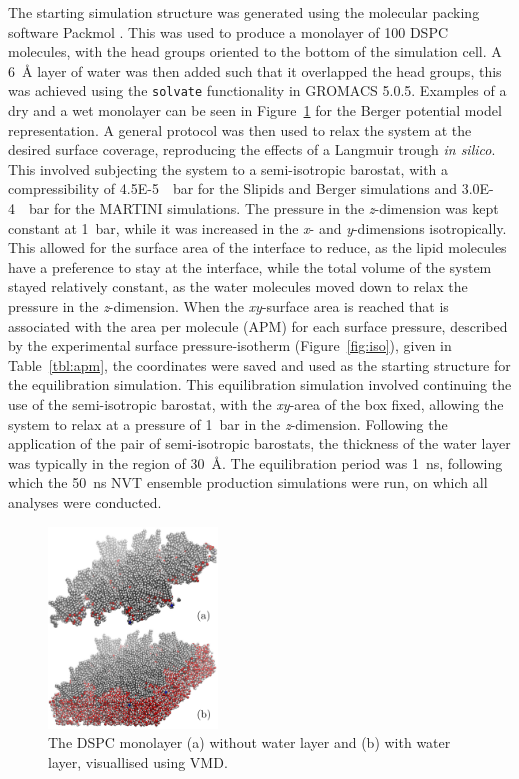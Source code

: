 \documentclass[amsmath,amssymb,twocolumn,superscriptaddress]{revtex4-1}
\begin{document}
The starting simulation structure was generated using the molecular packing software Packmol \cite{martinez_packmol_2009}.
This was used to produce a monolayer of 100 DSPC molecules, with the head groups oriented to the bottom of the simulation cell.
A \SI{6}{\angstrom} layer of water was then added such that it overlapped the head groups, this was achieved using the \texttt{solvate} functionality in GROMACS 5.0.5.
Examples of a dry and a wet monolayer can be seen in Figure~\ref{fig:drywet} for the Berger potential model representation.
A general protocol was then used to relax the system at the desired surface coverage, reproducing the effects of a Langmuir trough \emph{in silico}.
This involved subjecting the system to a semi-isotropic barostat, with a compressibility of \SI{4.5E-5}{\per\bar} for the Slipids and Berger simulations and \SI{3.0E-4}{\per\bar} for the MARTINI simulations.
The pressure in the \emph{z}-dimension was kept constant at \SI{1}{\bar}, while it was increased in the \emph{x}- and \emph{y}-dimensions isotropically.
This allowed for the surface area of the interface to reduce, as the lipid molecules have a preference to stay at the interface, while the total volume of the system stayed relatively constant, as the water molecules moved down to relax the pressure in the \emph{z}-dimension.
When the \emph{xy}-surface area is reached that is associated with the area per molecule (APM) for each surface pressure, described by the experimental surface pressure-isotherm (Figure~\ref{fig:iso}), given in Table~\ref{tbl:apm}, the coordinates were saved and used as the starting structure for the equilibration simulation.
This equilibration simulation involved continuing the use of the semi-isotropic barostat, with the \emph{xy}-area of the box fixed, allowing the system to relax at a pressure of \SI{1}{\bar} in the \emph{z}-dimension.
Following the application of the pair of semi-isotropic barostats, the thickness of the water layer was typically in the region of \SI{30}{\angstrom}.
The equilibration period was \SI{1}{\nano\second}, following which the \SI{50}{\nano\second} NVT ensemble production simulations were run, on which all analyses were conducted.
%
\begin{figure}[h]
\centering
  \includegraphics[width=0.4\textwidth]{dspcdrywet}
  \caption{The DSPC monolayer (a) without water layer and (b) with water
  layer, visuallised using VMD\cite{humphrey_vmd_1996}.}
  \label{fig:drywet}
\end{figure}
\end{document}
